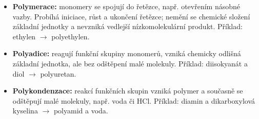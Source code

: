 \begin{itemize}
\item \textbf{Polymerace:} monomery se spojují do řetězce, např. otevřením násobné vazby. Probíhá iniciace, růst a ukončení řetězce; nemění se chemické složení základní jednotky a nevzniká vedlejší nízkomolekulární produkt. Příklad: ethylen $\to$ polyethylen.
\item \textbf{Polyadice:} reagují funkční skupiny monomerů, vzniká chemicky odlišná základní jednotka, ale bez odštěpení malé molekuly. Příklad: diisokyanát a diol $\to$ polyuretan.
\item \textbf{Polykondenzace:} reakcí funkčních skupin vzniká polymer a současně se odštěpují malé molekuly, např. voda či HCl. Příklad: diamin a dikarboxylová kyselina $\to$ polyamid a voda.
\end{itemize}

